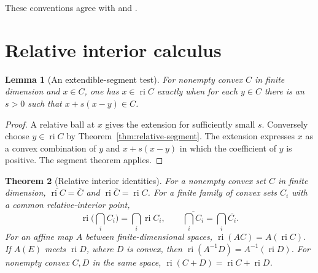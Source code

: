 \documentclass[11pt,oneside,openany]{book}
\theoremstyle{plain}
\newtheorem{theorem}{Theorem}[chapter]
\newtheorem{lemma}[theorem]{Lemma}
\theoremstyle{definition}
\theoremstyle{remark}
\begin{document}
These conventions agree with \cite[\S\S1--3 and 6]{Rockafellar}
and \cite[\S2.1]{Boyd}.

\section{Relative interior calculus}\label{v01-02}

\begin{lemma}[An extendible-segment test]\label{lem:ri-extendible}
For nonempty convex \(C\) in finite dimension and \(x\in C\),
one has \(x\in\operatorname{ri}C\) exactly when for each \(y\in C\)
there is an \(s>0\) such that \(x+s(x-y)\in C\).
\end{lemma}

\begin{proof}
A relative ball at \(x\) gives the extension for sufficiently small
\(s\). Conversely choose \(y\in\operatorname{ri}C\) by
Theorem~\ref{thm:relative-segment}. The extension expresses \(x\)
as a convex combination of \(y\) and \(x+s(x-y)\) in which the
coefficient of \(y\) is positive. The segment theorem applies.
\end{proof}

\begin{theorem}[Relative interior identities]\label{thm:ri-calculus}
For a nonempty convex set \(C\) in finite dimension,
\(\overline{\operatorname{ri}C}=\overline C\) and
\(\operatorname{ri}\overline C=\operatorname{ri}C\).
For a finite family of convex sets \(C_i\) with a common
relative-interior point,
\[
 \operatorname{ri}\Big(\bigcap_i C_i\Big)=\bigcap_i\operatorname{ri}C_i,
 \qquad
 \overline{\bigcap_i C_i}=\bigcap_i\overline{C_i}.
\]
For an affine map \(A\) between finite-dimensional spaces,
\(\operatorname{ri}(AC)=A(\operatorname{ri}C)\).
If \(A(E)\) meets \(\operatorname{ri}D\), where \(D\) is convex,
then \(\operatorname{ri}(A^{-1}D)=A^{-1}(\operatorname{ri}D)\).
For nonempty convex \(C,D\) in the same space,
\(\operatorname{ri}(C+D)=\operatorname{ri}C+\operatorname{ri}D\).
\end{theorem}
\end{document}
